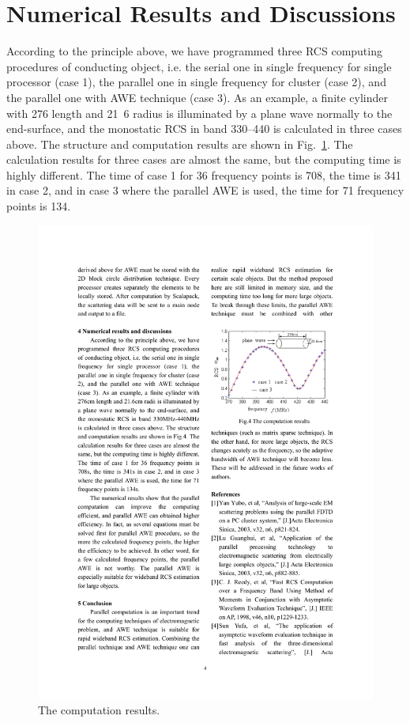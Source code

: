 \documentclass[conference, a4paper]{IEEEtran}
\begin{document}
\section{Numerical Results and Discussions}

According to the principle above, we have programmed three RCS computing 
procedures of conducting object, i.e. the serial one in single frequency for 
single processor (case 1), the parallel one in single frequency for cluster 
(case 2), and the parallel one with AWE technique (case 3). As an example, a 
finite cylinder with \unit{276}{\centi\meter} length and
\unit{21.6}{\centi\meter} radius is illuminated by a plane 
wave normally to the end-surface, and the monostatic RCS in band 
\unit{330}{\mega\hertz}--\unit{440}{\mega\hertz} is calculated in three cases above. The structure and 
computation results are shown in Fig.~\ref{rslt}. The calculation results for three 
cases are almost the same, but the computing time is highly different. The 
time of case 1 for 36 frequency points is \unit{708}{\second}, the time
is \unit{341}{\second} in case 2, 
and in case 3 where the parallel AWE is used, the time for 71 frequency 
points is \unit{134}{\second}.
\begin{figure}
\centerline{\includegraphics{pawe14}}
\caption{The computation results.}
\label{rslt}
\end{figure}
\end{document}
